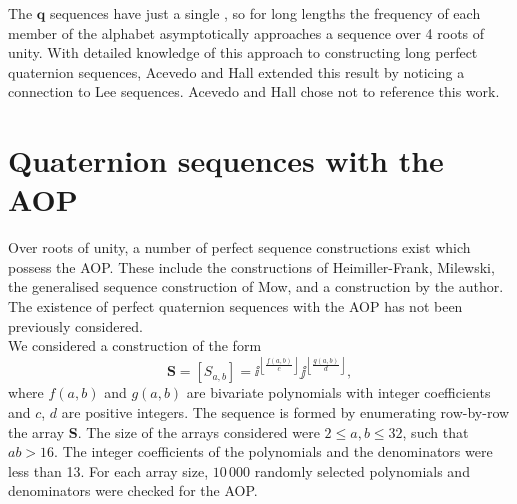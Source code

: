 \documentclass[12pt]{article}
\theoremstyle{definition}
\begin{document}
The $\textbf{q}$ sequences have just a single \kk, so for long lengths the frequency of each member of the 
alphabet asymptotically approaches a sequence over 4 roots of unity. With detailed knowledge of this approach 
to constructing long perfect quaternion sequences, Acevedo and Hall extended this result by noticing a connection 
to Lee sequences\cite{Lee1992}. Acevedo and Hall chose not to reference this work\cite{Acevedo2012}. 



%
%
%
%

\section{Quaternion sequences with the AOP}

Over roots of unity, a number of perfect sequence constructions exist which possess 
the AOP. These include the constructions of 
Heimiller-Frank\cite{Heimiller1961}\cite{Frank1962}, Milewski\cite{Milewski1983}, the generalised sequence construction 
of Mow\cite{Mow1996}, and a construction by the author\cite{Blake2013b}. 
The existence of perfect quaternion sequences with the AOP has not been previously considered. \\

We considered a construction of the form 
$$\textbf{S} = [S_{a,b}] = \ii^{\left\lfloor\frac{f(a,b)}{c}\right\rfloor}
\jj^{\left\lfloor\frac{g(a,b)}{d}\right\rfloor},$$ where $f(a,b)$ and $g(a,b)$ are bivariate 
polynomials with integer coefficients and $c$, $d$ are positive integers. The sequence is formed 
by enumerating row-by-row the array \textbf{S}. The size of the arrays considered were 
$2 \leq a, b \leq 32$, such that $a b > 16$. The integer coefficients of the polynomials and the 
denominators were less than 13. For each array size, $10\,000$ randomly selected polynomials and 
denominators were checked for the AOP. \\
\end{document}
